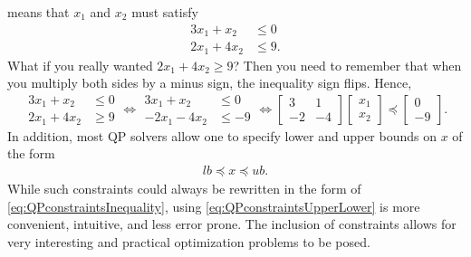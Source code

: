 means that $x_1$ and $x_2$ must satisfy
$$\begin{aligned} 3 x_1 + x_2 &\le 0  \\ 2 x_1 + 4 x_2 &\le 9. \end{aligned} $$
What if you really wanted $2 x_1 + 4 x_2 \ge 9$? Then you need to remember that when you multiply both sides by a minus sign, the inequality sign flips. Hence,
$$\begin{aligned} 3 x_1 + x_2 &\le 0  \\ 2 x_1 + 4 x_2 &\ge 9 \end{aligned} \iff \begin{aligned} 3 x_1 + x_2 &\le 0  \\ -2 x_1 - 4 x_2 &\le -9 \end{aligned} \iff  \left[
\begin{array}{rr}
3 & 1\\ -2 & -4
\end{array} \right] \begin{bmatrix}x_1 \\ x_2 \end{bmatrix} \preceq \left[
\begin{array}{r}
0 \\ -9
\end{array}
\right].$$
In addition, most QP solvers allow one to specify lower and upper bounds on $x$ of the form
\begin{align}
\label{eq:QPconstraintsUpperLower}
   lb \preceq x \preceq ub.
\end{align}
While such constraints could always be rewritten in the form of \eqref{eq:QPconstraintsInequality}, using \eqref{eq:QPconstraintsUpperLower} is more convenient, intuitive, and less error prone. The inclusion of constraints allows for very interesting and practical optimization problems to be posed. 

\vspace*{0.5cm}

